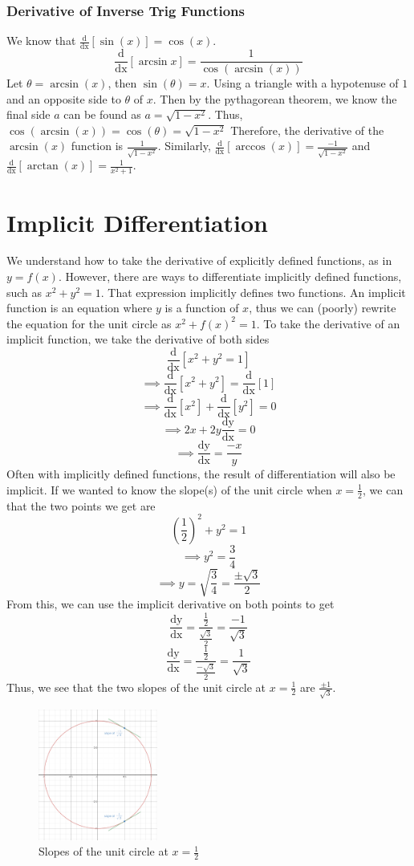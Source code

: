 \documentclass[oneside]{book}
\newcommand\tab[1][1cm]{\hspace*{#1}}
\newcommand\nextline{\newline\tab}
\newcommand\ddx[1]{\frac{\text{d}}{\text{dx}}\left[#1\right]}
\newcommand\dydx{\frac{\text{dy}}{\text{dx}}}
\begin{document}
\subsection{Derivative of Inverse Trig Functions}
\tab
We know that $\ddx{\sin(x)} = \cos(x)$. 
$$\ddx{\arcsin{x}}=\frac{1}{\cos(\arcsin(x))}$$
Let $\theta=\arcsin(x)$, then $\sin(\theta)=x$. Using a triangle with a hypotenuse of $1$ and an opposite side to $\theta$ of $x$. Then by the pythagorean theorem, we know the final side $a$ can be found as $a=\sqrt{1-x^2}$. Thus, $\cos(\arcsin(x)) = \cos(\theta) = \sqrt{1-x^2}$
\nextline
Therefore, the derivative of the $\arcsin(x)$ function is $\frac{1}{\sqrt{1-x^2}}$. Similarly, $\ddx{\arccos(x)} = \frac{-1}{\sqrt{1-x^2}}$ and $\ddx{\arctan(x)}=\frac{1}{x^2+1}$.
\chapter{Implicit Differentiation}
\tab
We understand how to take the derivative of explicitly defined functions, as in $y=f(x)$. However, there are ways to differentiate implicitly defined functions, such as $x^2+y^2=1$. That expression implicitly defines two functions. An implicit function is an equation where $y$ is a function of $x$, thus we can (poorly) rewrite the equation for the unit circle as $x^2+f(x)^2 = 1$.
\nextline
To take the derivative of an implicit function, we take the derivative of both sides
$$\ddx{x^2+y^2=1}$$
$$\implies \ddx{x^2+y^2} = \ddx{1}$$
$$\implies \ddx{x^2}+\ddx{y^2} = 0$$
$$\implies 2x + 2y\dydx = 0$$
$$\implies \dydx=\frac{-x}{y}$$
\tab
Often with implicitly defined functions, the result of differentiation will also be implicit.
\nextline
If we wanted to know the slope(s) of the unit circle when $x=\frac{1}{2}$, we can that the two points we get are
$$\left(\frac{1}{2}\right)^2 + y^2 = 1$$
$$\implies y^2 = \frac{3}{4}$$
$$\implies y=\sqrt{\frac{3}{4}}=\frac{\pm\sqrt{3}}{2}$$
\tab
From this, we can use the implicit derivative on both points to get
$$\dydx=\frac{\frac{1}{2}}{\frac{\sqrt{3}}{2}} = \frac{-1}{\sqrt{3}}$$
$$\dydx=\frac{\frac{1}{2}}{\frac{-\sqrt{3}}{2}} = \frac{1}{\sqrt{3}}$$
\tab
Thus, we see that the two slopes of the unit circle at $x=\frac{1}{2}$ are $\frac{\pm1}{\sqrt{3}}$.
\newline
\begin{figure}[h]
\centering
\includegraphics[width=0.35\textwidth]{l24f0}
\caption{Slopes of the unit circle at $x=\frac{1}{2}$}
\end{figure}
\end{document}
